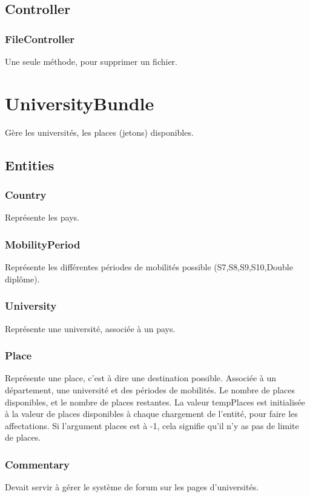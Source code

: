 \subsection{Controller}
\subsubsection{FileController}
Une seule méthode, pour supprimer un fichier.


\section{UniversityBundle}
Gère les universités, les places (jetons) disponibles.
\subsection{Entities}
\subsubsection{Country}
Représente les pays.

\subsubsection{MobilityPeriod}
Représente les différentes périodes de mobilités possible (S7,S8,S9,S10,Double diplôme).

\subsubsection{University}
Représente une université, associée à un pays.

\subsubsection{Place}
Représente une place, c'est à dire une destination possible. Associée à un département, une université et des périodes de mobilités. Le nombre de places disponibles, et le nombre de places restantes. La valeur tempPlaces est initialisée à la valeur de places disponibles à chaque chargement de l'entité, pour faire les affectations.
Si l'argument places est à -1, cela signifie qu'il n'y as pas de limite de places.


\subsubsection{Commentary}
Devait servir à gérer le système de forum sur les pages d'universités.


